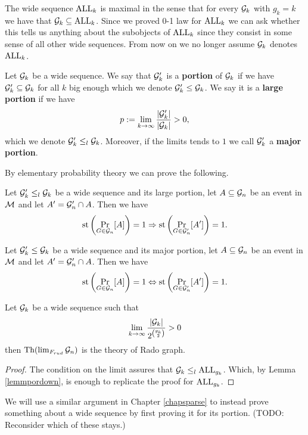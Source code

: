The wide sequence $\text{ALL}_k$ is maximal in the sense that for every $\mathcal{G}_k$ with $g_k=k$ we have that $\mathcal{G}_{k}\subseteq \text{ALL}_{k}$. Since we proved 0-1 law for $\text{ALL}_k$ we can ask whether this tells us anything about the subobjects of $\text{ALL}_k$ since they consist in some sense of all other wide sequences. From now on we no longer assume $\mathcal{G}_k$ denotes $\text{ALL}_k$.

\begin{defi}\label{defiportion}
Let $\mathcal{G}_k$ be a wide sequence. We say that $\mathcal{G}_k'$ is a \textbf{portion} of $\mathcal{G}_k$ if we have $\mathcal{G}_k'\subseteq \mathcal{G}_k$ for all $k$ big enough which we denote $\mathcal{G}_k'\leq \mathcal{G}_k$. We say it is a \textbf{large portion} if we have
\[p:=\lim_{k\to\infty}\frac{\left|{\mathcal{G}_k'}\right|}{\left|{\mathcal{G}_k}\right|}>0,\]
which we denote $\mathcal{G}_k' \leq_l \mathcal{G}_k$. Moreover, if the limits tends to $1$ we call $\mathcal{G}_k'$ a \textbf{major portion}.
\end{defi}

By elementary probability theory we can prove the following.

\begin{lemm}\label{lemmpordown}
Let $\mathcal{G}_k'\leq_l \mathcal{G}_k$ be a wide sequence and its large portion, let $A\subseteq \mathcal{G}_n$ be an event in $\mathcal{M}$ and let $A'=\mathcal{G}_n'\cap A$. Then we have
\[\text{st}\left(\Pr_{G\in\mathcal{G}_n}[A]\right)=1 \Rightarrow \text{st}\left(\Pr_{G\in\mathcal{G}_n'}[A']\right)=1.\]
\end{lemm}

\begin{lemm}\label{lemmporup}
Let $\mathcal{G}_k'\leq \mathcal{G}_k$ be a wide sequence and its major portion, let $A\subseteq \mathcal{G}_n$ be an event in $\mathcal{M}$ and let $A'=\mathcal{G}_n'\cap A$. Then we have
\[\text{st}\left(\Pr_{G\in\mathcal{G}_n}[A]\right)=1 \Leftrightarrow \text{st}\left(\Pr_{G\in\mathcal{G}_n'}[A']\right)=1.\]
\end{lemm}


\begin{crll}\label{crlltoobig}
Let $\mathcal{G}_k$ be a wide sequence such that 
\[\lim_{k\to\infty}\frac{\left|{\mathcal{G}_k}\right|}{2^{\binom{g_k}{2}}}>0\] then $\text{Th}(\lim_{F_{rud}}\mathcal{G}_n)$ is the theory of Rado graph.
\end{crll}
\begin{proof}
The condition on the limit assures that $\mathcal{G}_k\leq_l \text{ALL}_{g_k}$. Which, by Lemma \ref{lemmpordown}, is enough to replicate the proof for $\text{ALL}_{g_k}$.
\end{proof}

We will use a similar argument in Chapter \ref{chapsparse} to instead prove something about a wide sequence by first proving it for its portion. (TODO: Reconsider which of these stays.)

